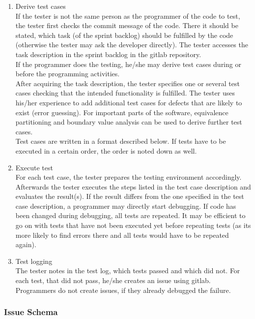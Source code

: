 \documentclass[twoside,12pt,a4paper]{article}
\begin{document}
\begin{enumerate}
 	\item Derive test cases \\
 	If the tester is not the same person as the programmer of the code to test, the tester first checks the commit message of the code. There it should be stated, which task (of the sprint backlog) should be fulfilled by the code (otherwise the tester may ask the developer directly). The tester accesses the task description in the sprint backlog in the gitlab repository. \\
 	If the programmer does the testing, he/she may derive test cases during or before the programming activities. \\
 	After acquiring the task description, the tester specifies one or several test cases checking that the intended functionality is fulfilled. The tester uses his/her experience to add additional test cases for defects that are likely to exist (error guessing). For important parts of the software, equivalence partitioning and boundary value analysis can be used to derive further test cases. \\
 	Test cases are written in a format described below. If tests have to be executed in a certain order, the order is noted down as well.

 	\item Execute test \\
 	For each test case, the tester prepares the testing environment accordingly. Afterwards the tester executes the steps listed in the test case description and evaluates the result(s). If the result differs from the one specified in the test case description, a programmer may directly start debugging. If code has been changed during debugging, all tests are repeated. It may be efficient to go on with tests that have not been executed yet before repeating tests (as its more likely to find errors there and all tests would have to be repeated again).

 	\item Test logging \\
 	The tester notes in the test log, which tests passed and which did not. For each test, that did not pass, he/she creates an issue using gitlab. Programmers do not create issues, if they already debugged the failure.

\end{enumerate}

\newpage

\subsubsection{Issue Schema} %
\label{sub:issue_schema}
\end{document}

